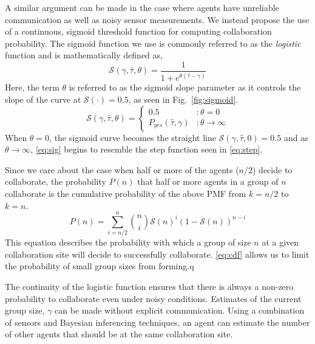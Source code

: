 \documentclass[conference]{ieeeconf}
\def\estt{\hat{\tau}}
\def\estg{\gamma}
\newcommand{\sig}{\mathcal{S}}
\begin{document}
A similar argument can be made in the case where agents have unreliable communication as well as noisy sensor measurements. We instead propose the use of a continuous, sigmoid threshold function for computing collaboration probability. The sigmoid function we use is commonly referred to as the \emph{logistic} function and is mathematically defined as,
\begin{equation}\label{eq:sig}
	\sig(\estg, \estt, \theta) = \frac{1}{1 + e^{\theta(\estt - \estg)}}
\end{equation}
Here, the term $\theta$ is referred to as the sigmoid slope parameter as it controls the slope of the curve at $\sig(\cdot) = 0.5$, as seen in Fig.~\ref{fig:sigmoid}. 
\begin{equation}
	\sig(\estg, \estt, \theta) =  \left\{
	\begin{array}{ll}
		0.5 & : \theta = 0\\ 
		P_{yes}(\estt,\estg) & : \theta \to \infty
	\end{array}\right.
\end{equation}
When $\theta = 0$, the sigmoid curve becomes the straight line $\sig(\estg, \estt, 0) = 0.5$ and as $\theta \to \infty$, \eqref{eq:sig} begins to resemble the step function seen in \eqref{eq:step}.

Since we care about the case when half or more of the agents ($n/2$) decide to collaborate, the probability $P(n)$ that half or more agents in a group of $n$ collaborate is the cumulative probability of the above PMF from $k = {n/2}$ to $k = n$. 
\begin{equation}
	P(n) = \sum\limits_{i={n/2}}^{n}\binom{n}{i}\sig(n)^{i}\left(1 - \sig(n)\right)^{n - i}\label{eq:cdf}
\end{equation}
This equation describes the probability with which a group of size $n$ at a given collaboration site will decide to successfully collaborate. \eqref{eq:cdf} allows us to limit the probability of small group sizes from forming.q 

The continuity of the logistic function ensures that there is always a non-zero probability to collaborate even under noisy conditions. Estimates of the current group size, $\estg$ can be made without explicit communication. Using a combination of sensors and Bayesian inferencing techniques, an agent can estimate the number of other agents that should be at the same collaboration site. 
\end{document}
